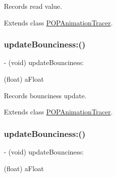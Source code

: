Records read value. 

Extends class \mbox{\hyperlink{interface_p_o_p_animation_tracer_a219ed8a35e2d3fa997e5688386572f15}{P\+O\+P\+Animation\+Tracer}}.

\mbox{\label{category_p_o_p_animation_tracer_07_internal_08_a61998b16b4eb5df6d11dbd0bd269339c}} 
\subsubsection{\texorpdfstring{update\+Bounciness\+:()}{updateBounciness:()}\hspace{0.1cm}{\footnotesize\ttfamily [1/2]}}
{\footnotesize\ttfamily -\/ (void) update\+Bounciness\+: \begin{DoxyParamCaption}\item[{(float)}]{a\+Float }\end{DoxyParamCaption}}

Records bounciness update. 

Extends class \mbox{\hyperlink{interface_p_o_p_animation_tracer_a61998b16b4eb5df6d11dbd0bd269339c}{P\+O\+P\+Animation\+Tracer}}.

\mbox{\label{category_p_o_p_animation_tracer_07_internal_08_a61998b16b4eb5df6d11dbd0bd269339c}} 
\subsubsection{\texorpdfstring{update\+Bounciness\+:()}{updateBounciness:()}\hspace{0.1cm}{\footnotesize\ttfamily [2/2]}}
{\footnotesize\ttfamily -\/ (void) update\+Bounciness\+: \begin{DoxyParamCaption}\item[{(float)}]{a\+Float }\end{DoxyParamCaption}}

